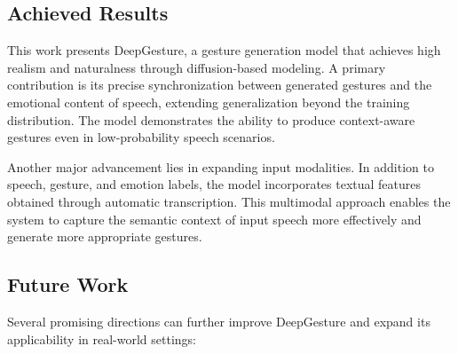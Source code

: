 \subsection{Achieved Results}

This work presents DeepGesture, a gesture generation model that achieves high realism and naturalness through diffusion-based modeling. A primary contribution is its precise synchronization between generated gestures and the emotional content of speech, extending generalization beyond the training distribution. The model demonstrates the ability to produce context-aware gestures even in low-probability speech scenarios.

Another major advancement lies in expanding input modalities. In addition to speech, gesture, and emotion labels, the model incorporates textual features obtained through automatic transcription. This multimodal approach enables the system to capture the semantic context of input speech more effectively and generate more appropriate gestures.

\subsection{Future Work}

Several promising directions can further improve DeepGesture and expand its applicability in real-world settings:

